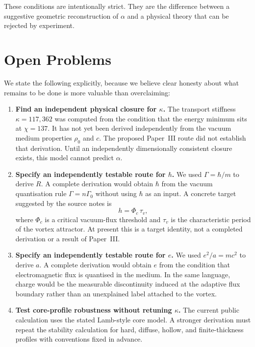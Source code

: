 \documentclass[11pt]{article}
\begin{document}
These conditions are intentionally strict. They are the difference between a
suggestive geometric reconstruction of $\alpha$ and a physical theory that can
be rejected by experiment.


\section{Open Problems}

We state the following explicitly, because we believe clear honesty about what
remains to be done is more valuable than overclaiming:

\begin{enumerate}

\item \textbf{Find an independent physical closure for $\kappa$.}
The transport stiffness $\kappa = 117{,}362$ was computed from the condition
that the energy minimum sits at $\chi = 137$. It has not yet been derived
independently from the vacuum medium properties $\rho_0$ and $c$. The proposed
Paper~III route did not establish that derivation. Until an independently
dimensionally consistent closure exists, this model cannot predict $\alpha$.

\item \textbf{Specify an independently testable route for $\hbar$.}
We used $\Gamma = \hbar/m$ to derive $R$. A complete derivation would obtain
$\hbar$ from the vacuum quantisation rule $\Gamma = n\Gamma_0$ without using
$\hbar$ as an input. A concrete target suggested by the source notes is
\begin{equation}
  h=\Phi_c\,\tau_v,
\end{equation}
where $\Phi_c$ is a critical vacuum-flux threshold and $\tau_v$ is the
characteristic period of the vortex attractor. At present this is a target
identity, not a completed derivation or a result of Paper~III.

\item \textbf{Specify an independently testable route for $e$.}
We used $e^2/a = mc^2$ to derive $a$. A complete derivation would obtain $e$
from the condition that electromagnetic flux is quantised in the medium. In the
same language, charge would be the measurable discontinuity induced at the
adaptive flux boundary rather than an unexplained label attached to the vortex.

\item \textbf{Test core-profile robustness without retuning $\kappa$.}
The current public calculation uses the stated Lamb-style core model. A stronger
derivation must repeat the stability calculation for hard, diffuse, hollow, and
finite-thickness profiles with conventions fixed in advance.


\end{enumerate}
\end{document}
